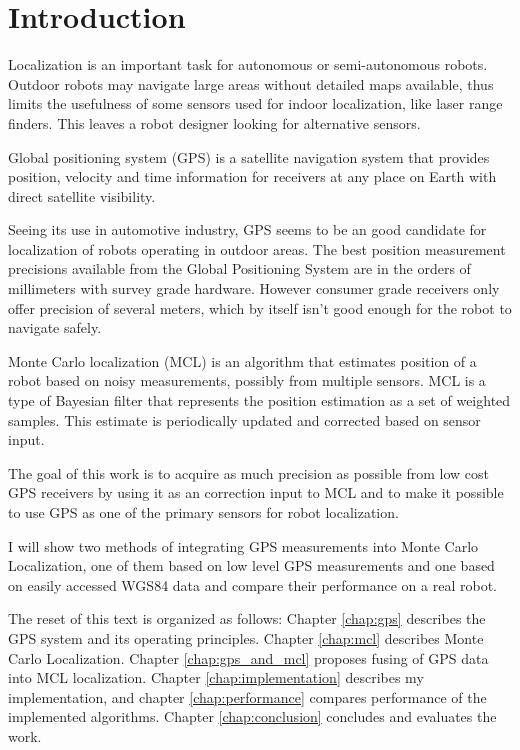 \chapter{Introduction}

Localization is an important task for autonomous or semi-autonomous robots.
Outdoor robots may navigate large areas without detailed maps available, thus limits
the usefulness of some sensors used for indoor localization, like laser range finders.
This leaves a robot designer looking for alternative sensors.


Global positioning system (GPS) is a satellite navigation system that
provides position, velocity and time information for receivers at any place on Earth with direct
satellite visibility.

Seeing its use in automotive industry, GPS seems to be an good candidate for
localization of robots operating in outdoor areas.
The best position measurement precisions available from the Global Positioning System
are in the orders of millimeters with survey grade hardware.
However consumer grade receivers only offer precision of several meters, which
by itself isn't good enough for the robot to navigate safely.


Monte Carlo localization (MCL) is an algorithm that estimates position of a robot
based on noisy measurements, possibly from multiple sensors.
MCL is a type of Bayesian filter that represents the position estimation as a
set of weighted samples.
This estimate is periodically updated and corrected based on sensor input.


\vspace{1.5em}


The goal of this work is to acquire as much precision as possible from low cost
GPS receivers by using it as an correction input to MCL and to make it possible to use
GPS as one of the primary sensors for robot localization.

I will show two methods of integrating GPS measurements into Monte Carlo Localization,
one of them based on low level GPS measurements and one based on easily accessed WGS84 data
and compare their performance on a real robot.



The reset of this text is organized as follows:
Chapter \ref{chap:gps} describes the GPS system and its operating principles.
Chapter \ref{chap:mcl} describes Monte Carlo Localization.
Chapter \ref{chap:gps_and_mcl} proposes fusing of GPS data into MCL localization.
Chapter \ref{chap:implementation} describes my implementation,
and chapter \ref{chap:performance} compares performance of the implemented algorithms.
Chapter \ref{chap:conclusion} concludes and evaluates the work.
